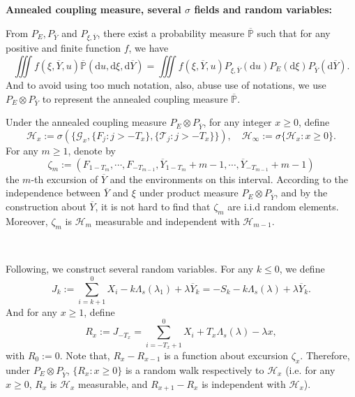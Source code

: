 \documentclass[]{article}
\numberwithin{equation}{section}
\theoremstyle{thmstyleone}%
\theoremstyle{thmstyletwo}%
\theoremstyle{thmstylethree}%
\theoremstyle{thmstylefour}%
\theoremstyle{thmstylefive}%
\theoremstyle{thmstylesix}%
\renewcommand{\d}{\mathrm{d}}
\renewcommand{\P}{\mathbb{P}}
\begin{document}
	
	\noindent\textbf{Annealed coupling measure, several $\sigma$ fields and random variables:}
	
	From $P_E, P_{\overline{Y}}$ and $P_{\xi,\overline{Y}}$, there exist a probability measure $\overline{\P}$  such that for any positive and finite function $f$, we have
	\begin{equation}\label{eq61}
		\iiint f(\xi,\overline{Y},u) \overline{\P}(\d u,\d \xi,\d \overline{Y})
		=
		\iiint f(\xi,\overline{Y},u) P_{\xi,\overline{Y}}(\d u) P_E(\d \xi) P_{\overline{Y}} (\d \overline{Y}).
	\end{equation}
	And to avoid using too much notation, also, abuse use of notations, we use $ P_E\otimes P_{\overline{Y}} $ to represent the annealed coupling measure $\overline{\P}$.
	
	Under the annealed coupling measure $P_E\otimes P_{\overline{Y}}$, 
	for any integer $x\geqslant 0$, define
	\begin{equation}\label{def of Hx}
		\mathcal{H}_x:= \sigma\left(\{ \mathcal{G}_x,\{ F_j:j > -T_x \},\{\mathcal{T}_j:j>-T_x\} \}\right), \quad \mathcal{H}_\infty := \sigma\{\mathcal{H}_x:x\geqslant 0\}.
	\end{equation} 
	For any $m\geqslant 1$, denote by
	\begin{equation}\label{def of zeta}\zeta_m:=(F_{1-T_m},\cdots,F_{-T_{m-1}},\overline{Y}_{1-T_m}+m-1,\cdots,\overline{Y}_{-T_{m-1}}+m-1)
	\end{equation}
	the $m$-th excursion of $\overline{Y}$ and the environments on this interval.
	According to the independence between $\overline{Y}$ and $\xi$ under product measure $P_E\otimes P_{\overline{Y}}$, and by the construction about $\overline{Y}$, it is not hard to find that
	$\zeta_m$ are i.i.d random elements. Moreover, $\zeta_m$ is $\mathcal{H}_m$ measurable and independent with $\mathcal{H}_{m-1}$.
	
	\
	
	Following, we construct several random variables.
	For any $k\leqslant0$, we define
	\begin{equation}\label{def of Jk}
		J_k := \sum_{i=k+1}^{0} X_i -k\Lambda_s(\lambda_1)+\lambda \overline{Y}_{k}= -S_k-k\Lambda_s(\lambda)+\lambda \overline{Y}_k.
	\end{equation}
	And for any $x\geqslant1$, define
	\begin{equation}\label{def of R_x}
		R_x:= J_{-T_x} =  \sum_{i=-T_x+1}^{0} X_i + T_x\Lambda_s(\lambda)-\lambda x,
	\end{equation}
	with $R_0:=0$.
	Note that, $ R_x-R_{x-1} $ is a function about excursion $\zeta_{x}$. Therefore, under $P_E\otimes P_{\overline{Y}}$,
	$\{R_x:x\geqslant 0\}$ is a random walk respectively to $\mathcal{H}_x$ (i.e. for any $x\geqslant0$, $R_x$ is $\mathcal{H}_x$ measurable, and $R_{x+1}-R_x$ is independent with $\mathcal{H}_x$).
	
\end{document}
